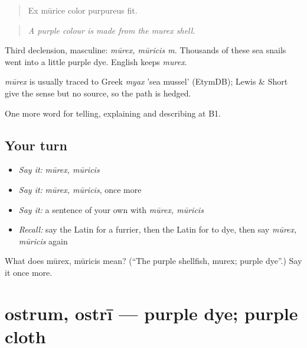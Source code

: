 \begin{quote}
Ex mūrice color purpureus fit.
\end{quote}

\begin{quote}
\emph{A purple colour is made from the murex shell.}
\end{quote}

Third declension, masculine: \emph{mūrex, mūricis m.} Thousands of these sea snails went into a little purple dye. English keeps \emph{murex}.

\begin{cousinweb}
\emph{mūrex} is usually traced to Greek \emph{myax} 'sea mussel' (EtymDB); Lewis \& Short give the sense but no source, so the path is hedged.
\end{cousinweb}

\begin{grammarlens}[title={What you've built}]
One more word for telling, explaining and describing at B1.
\end{grammarlens}

\subsection*{Your turn}
\begin{itemize}
\raggedright
  \item \emph{Say it:} \emph{mūrex, mūricis}
  \item \emph{Say it:} \emph{mūrex, mūricis}, once more
  \item \emph{Say it:} a sentence of your own with \emph{mūrex, mūricis}
  \item \emph{Recall:} say the Latin for a furrier, then the Latin for to dye, then say \emph{mūrex, mūricis} again
\end{itemize}

\begin{tcolorbox}[breakable,colback=teal!4,colframe=teal!35!black,title={Before you move on}]
What does mūrex, mūricis mean? (\textquotedblleft{}The purple shellfish, murex; purple dye\textquotedblright{}.) Say it once more.
\end{tcolorbox}
\section[ostrum, ostrī]{ostrum, ostrī — purple dye; purple cloth}

\label{lesson:LA-C468-ostrum}



